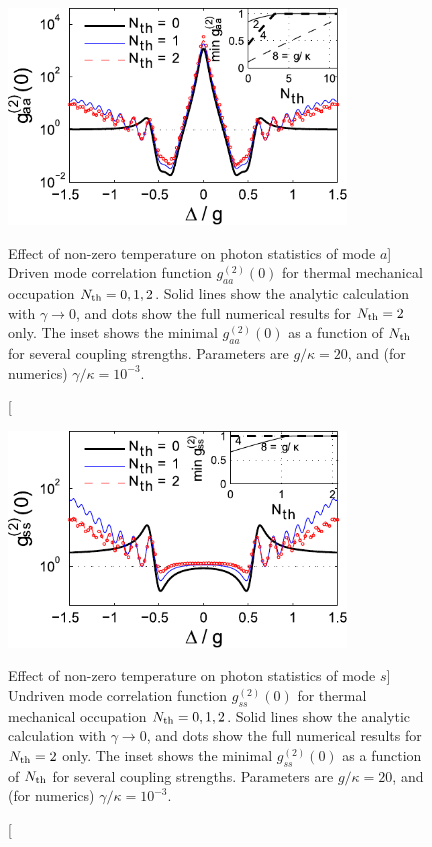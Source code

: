 \begin{figure}
\centering
  \includegraphics[width=0.8\textwidth]{./figs_Komar2013/fig4b.pdf}
  \caption
  [Effect of non-zero temperature on photon statistics of mode $a$]
  {
  \label{fig:thermal_g2_b}
  Driven mode correlation function $g^{(2)}_{aa}(0)$
  for thermal mechanical occupation $N_{\rm th} = 0,1,2$.
  Solid lines show the analytic calculation with $\gamma \rightarrow 0$,
   and  dots show the full numerical results for $N_{\rm th} = 2$ only.
  The inset shows the minimal $g^{(2)}_{aa}(0)$ as a function of $N_{\rm th}$ 
  for several
  coupling strengths. 
  Parameters are $g/\kappa=20$, and (for numerics) $\gamma/\kappa =  10^{-3}$.
}
\end{figure} 

\begin{figure}
\centering
  \includegraphics[width=0.8\textwidth]{./figs_Komar2013/fig4c.pdf}
  \caption
  [Effect of non-zero temperature on photon statistics of mode $s$]
  {
  \label{fig:thermal_g2_c}
  Undriven mode correlation function $g^{(2)}_{ss}(0)$
  for thermal mechanical occupation $N_{\rm th} = 0,1,2$.
  Solid lines show the analytic calculation with $\gamma \rightarrow 0$,
   and  dots show the full numerical results for $N_{\rm th} = 2$ only.
  The inset shows the minimal $g^{(2)}_{ss}(0)$ as a function of $N_{\rm th}$ 
  for several
  coupling strengths. 
  Parameters are $g/\kappa=20$, and (for numerics) $\gamma/\kappa =  10^{-3}$.
}
\end{figure} 


